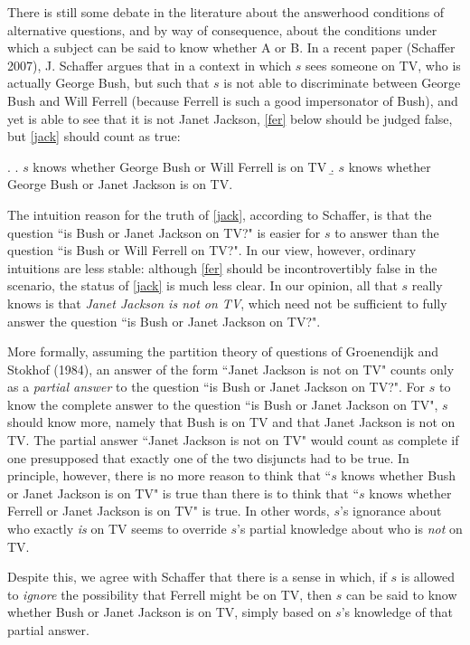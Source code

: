 \documentclass[times,10pt,twocolumn]{article}
\begin{document}
There is still some debate in the literature about the answerhood
conditions of alternative questions, and by way of consequence,
about the conditions under which a subject can be said to know
whether A or B. In a recent paper (Schaffer 2007), J. Schaffer
argues that in a context in which $s$ sees someone on TV, who is
actually George Bush, but such that $s$ is not able to
discriminate between George Bush and Will Ferrell (because Ferrell
is such a good impersonator of Bush), and yet is able to see that
it is not Janet Jackson, \ref{fer} below should be judged false,
but \ref{jack} should count as true:

\ex. \a.\label{fer} $s$ knows whether George Bush or Will Ferrell
is on TV \b.\label{jack} $s$ knows whether George Bush or Janet
Jackson is on TV.

The intuition reason for the truth of \ref{jack}, according to
Schaffer, is that the question ``is Bush or Janet Jackson on TV?"
is easier for $s$ to answer than the question ``is Bush or Will
Ferrell on TV?". In our view, however, ordinary intuitions are
less stable: although \ref{fer} should be incontrovertibly false
in the scenario, the status of \ref{jack} is much less clear. In
our opinion, all that $s$ really knows is that \emph{Janet Jackson
is not on TV}, which need not be sufficient to fully answer the
question ``is Bush or Janet Jackson on TV?".

More formally, assuming the partition theory of questions of
Groenendijk and Stokhof (1984), an answer of the form ``Janet
Jackson is not on TV" counts only as a \emph{partial answer} to
the question ``is Bush or Janet Jackson on TV?". For $s$ to know
the complete answer to the question ``is Bush or Janet Jackson on
TV", $s$ should know more, namely that Bush is on TV and that
Janet Jackson is not on TV. The partial answer ``Janet Jackson is
not on TV" would count as complete if one presupposed that exactly
one of the two disjuncts had to be true. In principle, however,
there is no more reason to think that ``$s$ knows whether Bush or
Janet Jackson is on TV" is true than there is to think that ``$s$
knows whether Ferrell or Janet Jackson is on TV" is true. In other
words, $s$'s ignorance about who exactly \emph{is} on TV seems to
override $s$'s partial knowledge about who is \emph{not} on TV.

Despite this, we agree with Schaffer that there is a sense in
which, if $s$ is allowed to \emph{ignore} the possibility that
Ferrell might be on TV, then $s$ can be said to know whether Bush
or Janet Jackson is on TV, simply based on $s$'s knowledge of that
partial answer.
\end{document}
